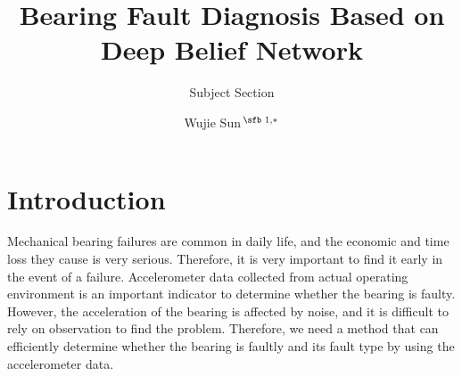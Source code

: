 \documentclass{bioinfo}
\begin{document}

\subtitle{Subject Section}

\title[Bearing Fault Diagnosis Based on Deep Belief Network]{Bearing Fault Diagnosis Based on Deep Belief Network}
\author[Sun.]{Wujie Sun\,$^{\text{\sfb 1,}*}$}
\address{$^{\text{\sf 1}}$School of Software Engineering, South China University of Technology, Guangzhou 510006, P.R. China.}





\maketitle

\section{Introduction}
Mechanical bearing failures are common in daily life, and the economic and time loss they cause is very serious. Therefore, it is very important to find it early in the event of a failure. Accelerometer data collected from actual operating environment is an important indicator to determine whether the bearing is faulty. However, the acceleration of the bearing is affected by noise, and it is difficult to rely on observation to find the problem. Therefore, we need a method that can efficiently determine whether the bearing is faultly and its fault type by using the accelerometer data. 
\end{document}

